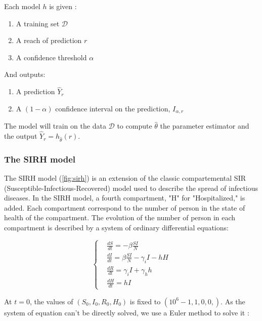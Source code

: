 Each model ${h}$ is given : 

\begin{enumerate}
    \item A training set $\mathcal{D}$
    \item A reach of prediction $r$
    \item A confidence threshold $\alpha$
\end{enumerate}
And outputs: 

\begin{enumerate}
    \item A prediction $\hat{Y}_r$
    \item A $(1-\alpha)$ confidence interval on the prediction, $I_{\alpha, r}$
\end{enumerate}

The model will train on the data $\mathcal{D}$ to compute $\hat{\theta}$ the parameter estimator and the output $\hat{Y}_r = {h}_{\hat{\theta}}(r)$.


\subsubsection{The SIRH model}


The SIRH model (\ref*{fig:sirh}) is an extension of the classic compartemental SIR (Susceptible-Infectious-Recovered) model used to describe the spread of infectious diseases.
In the SIRH model, a fourth compartment, "H" for "Hospitalized," is added. 
Each compartment correspond to the number of person in the state of health of the compartment. 
The evolution of the number of person in each compartment is described by a system of ordinary differential equations: 

\begin{equation}
    \left\{
    \begin{aligned}
        &\frac{dS}{dt} = - \beta \frac{SI}{N} \\
        &\frac{dI}{dt} = \beta \frac{SI}{N} - \gamma_i I - h H \\
        &\frac{dR}{dt} = \gamma_i I + \gamma_h h \\
        &\frac{dH}{dt} = h I
    \end{aligned}
    \right.
\end{equation}

At $t=0$, the values of $(S_0, I_0, R_0, H_0)$ is fixed to $(10^6 -1, 1, 0, 0,) $. 
As the system of equation can't be directly solved, we use a Euler method to solve it : \\


